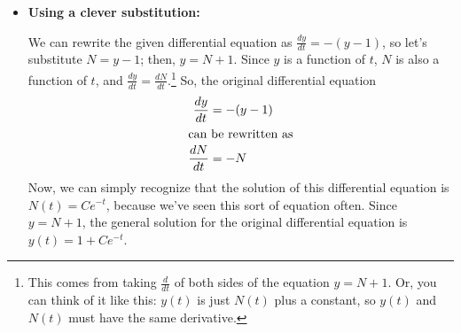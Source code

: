 \documentclass[main]{subfiles}
\begin{document}
\begin{enumerate}
\begin{solution}
\begin{itemize}
    If $y \neq 1$, then $1 - y \neq 0$, and we can separate to
    get $\frac{1}{1 - y} \frac{dy}{dt} = 1$.\footnote{If we do this when
    $1 -  y = 0$, we are dividing by 0, which is bad.}  We can
    rewrite this as \[- 1 \cdot \frac{1}{y - 1} \frac{dy}{dt} =
    1.\footnote{You don't \textit{have} to simplify like this before
    integrating, but it might make integrating easier!}\] Integrating
    both sides with respect to $t$, we have \[- \ln | y - 1| = t + C.\] 
    Multiplying
    both sides by $-1$ gives \[\ln | y - 1| = - t -  C.\] Since
    $-C$ is just an arbitrary constant, we can give it a new name;
    let's call it $A$.  So,
    \begin{align*}
    \ln|y - 1| & = A - t \\
    e^{\ln |y - 1|} & = e^{A -  t} \\
    |y - 1| & = e^A e^{-t} \\
    y - 1 & = \pm e^{A} e^{- t}
    \end{align*} Again, $\pm e^A$ is just an arbitrary constant, so
    let's call it $B$.\footnote{Since $B = \pm e^A$, $B$ should
    technically be non-zero.}  So, \[y - 1 = B e^{- t},\] and
    .\footnote{The way we solved this,
    $B$ had to be non-zero.  However, at the very beginning, we
    pointed out that $y(t) = 1$ is a solution.  This solution could
    be written as $y(t) = 1 + B e^{- t}$ with $B = 0$.  So, in the
    final answer $y(t) = 1 + B e^{-t}$, $B$ really \textit{can} be
    any constant.}

    \item \textbf{Using a clever substitution:}

    We can rewrite the given differential equation as $\frac{dy}{dt} =
    - (y - 1)$, so let's substitute $N = y - 1$; then, $y = N +
    1$.  Since $y$ is a function of $t$, $N$ is also a function of $t$,
    and $\frac{dy}{dt} = \frac{dN}{dt}$.\footnote{This comes from taking
    $\frac{d}{dt}$ of both sides of the equation $y = N + 1$.  Or,
    you can think of it like this: $y(t)$ is just $N(t)$ plus a
    constant, so $y(t)$ and $N(t)$ must have the same derivative.}
    So, the original differential equation
    \begin{align*}
    \frac{dy}{dt} &= - (y - 1) \\
    \intertext{can be rewritten as}
    \frac{dN}{dt} &= - N
    \end{align*}
    Now, we can simply recognize that the solution of this differential
    equation is $N(t) = C e^{- t}$, because we've seen this sort of
    equation often.  Since $y = N + 1$, the general
    solution for the original differential equation is $y(t) = 1 + C
    e^{- t}$.
    

\end{itemize}
\end{solution}
\end{enumerate}
\end{document}
